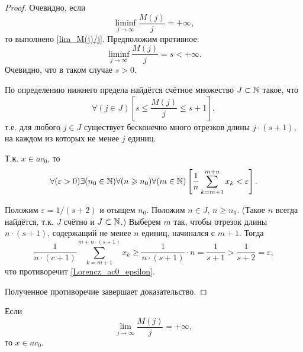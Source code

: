 \begin{proof}
Очевидно, если
\begin{equation}
	\liminf_{j \to \infty} \frac{M(j)}{j} = +\infty
	,
\end{equation}
то выполнено \eqref{lim_M(j)/j}.
Предположим противное:
\begin{equation}
	\liminf_{j \to \infty} \frac{M(j)}{j} = s < +\infty
	.
\end{equation}
Очевидно, что в таком случае $s>0$.

По определению нижнего предела найдётся счётное множество
$J\subset\N$ такое, что
\begin{equation}
	\forall(j\in J)\left[s \leq \frac{M(j)}{j} \leq s+1 \right],
\end{equation}
т.е. для любого $j\in J$ существует бесконечно много отрезков длины $j\cdot(s+1)$,
на каждом из которых не менее $j$ единиц.

Т.к. $x\in ac_0$, то
\begin{equation}\label{Lorencz_ac0_epsilon}
	\forall(\varepsilon>0)
	\exists(n_0\in\N)
	\forall(n \geq n_0)
	\forall(m\in\N)
	\left[
		\frac{1}{n} \sum_{k=m+1}^{m+n}x_k < \varepsilon
	\right]
	.
\end{equation}

Положим $\varepsilon = 1/(s+2)$ и отыщем $n_0$.
Положим $n\in J$, $n\geq n_0$.
(Такое $n$ всегда найдётся, т.к. $J$ счётно и $J\subset\N$.)
Выберем $m$ так, чтобы отрезок длины $n\cdot(s+1)$,
содержащий не менее $n$ единиц,
начинался с $m+1$.
Тогда
\begin{equation}
	\frac{1}{n\cdot(c+1)}\sum_{k=m+1}^{m+n\cdot(s+1)}x_k
	\geq
	\frac{1}{n\cdot(s+1)} \cdot n
	=
	\frac{1}{s+1}
	>
	\frac{1}{s+2}
	=
	\varepsilon,
\end{equation}
что противоречит \eqref{Lorencz_ac0_epsilon}.

Полученное противоречие завершает доказательство.
\end{proof}

\begin{lemma}
	\label{thm:lim_M(j)/j_dost}
	Если
	\begin{equation}\label{lim_M(j)/j_dost}
		\lim_{j \to \infty} \frac{M(j)}{j} = +\infty
		,
	\end{equation}
	то $x \in ac_0$.
\end{lemma}

